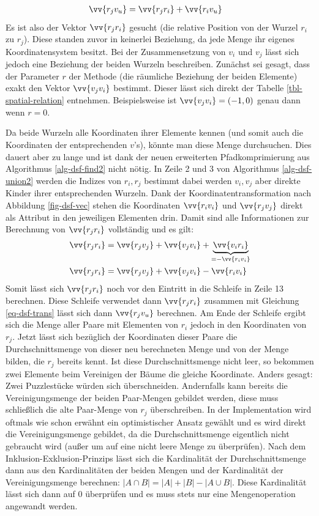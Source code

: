 \documentclass{whswinvcbook}
\begin{document}
\begin{align}\label{eq-dsf-trans}
    \vv{r_j v_u}&=\vv{r_j r_i}+\vv{r_i v_u}
\end{align}
Es ist also der Vektor $\vv{r_j r_i}$ gesucht (die relative Position von der Wurzel $r_i$ zu $r_j$). Diese standen zuvor in keinerlei Beziehung, da jede Menge ihr eigenes Koordinatensystem besitzt. Bei der Zusammensetzung von $v_i$ und $v_j$ lässt sich jedoch eine Beziehung der beiden Wurzeln beschreiben. Zunächst sei gesagt, dass der Parameter $r$ der Methode (die räumliche Beziehung der beiden Elemente) exakt den Vektor $\vv{v_j v_i}$ bestimmt. Dieser lässt sich direkt der Tabelle \ref{tbl-spatial-relation} entnehmen. Beispielsweise ist $\vv{v_j v_i}=(-1,0)$ genau dann wenn $r=0$.

Da beide Wurzeln alle Koordinaten ihrer Elemente kennen (und somit auch die Koordinaten der entsprechenden $v$'s), könnte man diese Menge durchsuchen. Dies dauert aber zu lange und ist dank der neuen erweiterten Pfadkomprimierung aus Algorithmus \ref{alg-dsf-find2} nicht nötig. In Zeile 2 und 3 von Algorithmus \ref{alg-dsf-union2} werden die Indizes von $r_i,r_j$ bestimmt dabei werden $v_i,v_j$ aber direkte Kinder ihrer entsprechenden Wurzeln. Dank der Koordinatentransformation nach Abbildung \ref{fig-dsf-vec} stehen die Koordinaten $\vv{r_i v_i}$ und $\vv{r_j v_j}$ direkt als Attribut in den jeweiligen Elementen drin. Damit sind alle Informationen zur Berechnung von $\vv{r_j r_i}$ vollständig und es gilt:
\begin{align}\label{eq-dsf-trans2}
    \vv{r_j r_i}&=\vv{r_j v_j}+\vv{v_j v_i}+\underbrace{\vv{v_i r_i}}_{=-\vv{r_i v_i}}\nonumber\\
    \vv{r_j r_i}&=\vv{r_j v_j}+\vv{v_j v_i}-\vv{r_i v_i}
\end{align}
Somit lässt sich $\vv{r_j r_i}$ noch vor den Eintritt in die Schleife in Zeile 13 berechnen. Diese Schleife verwendet dann $\vv{r_j r_i}$ zusammen mit Gleichung \ref{eq-dsf-trans} lässt sich dann $\vv{r_j v_u}$ berechnen. Am Ende der Schleife ergibt sich die Menge aller Paare mit Elementen von $r_i$ jedoch in den Koordinaten von $r_j$. Jetzt lässt sich bezüglich der Koordinaten dieser Paare die Durchschnittsmenge von dieser neu berechneten Menge und von der Menge bilden, die $r_j$ bereits kennt. Ist diese Durchschnittsmenge nicht leer, so bekommen zwei Elemente beim Vereinigen der Bäume die gleiche Koordinate. Anders gesagt: Zwei Puzzlestücke würden sich überschneiden. Andernfalls kann bereits die Vereinigungsmenge der beiden Paar-Mengen gebildet werden, diese muss schließlich die alte Paar-Menge von $r_j$ überschreiben. In der Implementation wird oftmals wie schon erwähnt ein optimistischer Ansatz gewählt und es wird direkt die Vereinigungsmenge gebildet, da die Durchschnittsmenge eigentlich nicht gebraucht wird (außer um auf eine nicht leere Menge zu überprüfen). Nach dem Inklusion-Exklusion-Prinzips lässt sich die Kardinalität der Durchschnittsmenge dann aus den Kardinalitäten der beiden Mengen und der Kardinalität der Vereinigungsmenge berechnen: $|A\cap B|=|A|+|B|-|A\cup B|$. Diese Kardinalität lässt sich dann auf $0$ überprüfen und es muss stets nur eine Mengenoperation angewandt werden.
\end{document}
